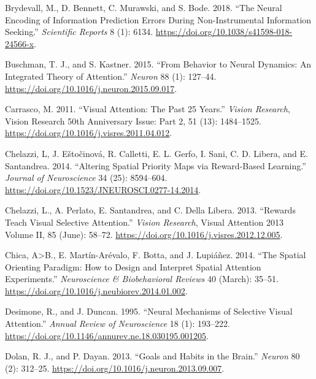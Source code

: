 \documentclass[11pt,halfline,a4paper,]{ouparticle}
\newlength{\cslhangindent}
\newlength{\cslentryspacingunit} %
\newenvironment{CSLReferences}[2] %
 {%
  \setlength{\parindent}{0pt}
  \ifodd #1
  \let\oldpar\par
  \def\par{\hangindent=\cslhangindent\oldpar}
  \fi
  \setlength{\parskip}{#2\cslentryspacingunit}
 }%
 {}
\begin{document}
\begin{CSLReferences}{1}{0}
\leavevmode{}%
Brydevall, M., D. Bennett, C. Murawski, and S. Bode. 2018. {``The Neural Encoding of Information Prediction Errors During Non-Instrumental Information Seeking.''} \emph{Scientific Reports} 8 (1): 6134. \url{https://doi.org/10.1038/s41598-018-24566-x}.

\leavevmode{}%
Buschman, T. J., and S. Kastner. 2015. {``From Behavior to Neural Dynamics: {An} Integrated Theory of Attention.''} \emph{Neuron} 88 (1): 127--44. \url{https://doi.org/10.1016/j.neuron.2015.09.017}.

\leavevmode{}%
Carrasco, M. 2011. {``Visual Attention: {The} Past 25 Years.''} \emph{Vision Research}, Vision {Research} 50th {Anniversary Issue}: {Part} 2, 51 (13): 1484--1525. \url{https://doi.org/10.1016/j.visres.2011.04.012}.

\leavevmode{}%
Chelazzi, L, J. Eštočinová, R. Calletti, E. L. Gerfo, I. Sani, C. D. Libera, and E. Santandrea. 2014. {``Altering {Spatial Priority Maps} via {Reward-Based Learning}.''} \emph{Journal of Neuroscience} 34 (25): 8594--604. \url{https://doi.org/10.1523/JNEUROSCI.0277-14.2014}.

\leavevmode{}%
Chelazzi, L., A. Perlato, E. Santandrea, and C. Della Libera. 2013. {``Rewards Teach Visual Selective Attention.''} \emph{Vision Research}, Visual {Attention} 2013 {Volume II}, 85 (June): 58--72. \url{https://doi.org/10.1016/j.visres.2012.12.005}.

\leavevmode{}%
Chica, A\textgreater B., E. Martín-Arévalo, F. Botta, and J. Lupiáñez. 2014. {``The {Spatial Orienting} Paradigm: {How} to Design and Interpret Spatial Attention Experiments.''} \emph{Neuroscience \& Biobehavioral Reviews} 40 (March): 35--51. \url{https://doi.org/10.1016/j.neubiorev.2014.01.002}.

\leavevmode{}%
Desimone, R., and J. Duncan. 1995. {``Neural {Mechanisms} of {Selective Visual Attention}.''} \emph{Annual Review of Neuroscience} 18 (1): 193--222. \url{https://doi.org/10.1146/annurev.ne.18.030195.001205}.

\leavevmode{}%
Dolan, R. J., and P. Dayan. 2013. {``Goals and {Habits} in the {Brain}.''} \emph{Neuron} 80 (2): 312--25. \url{https://doi.org/10.1016/j.neuron.2013.09.007}.


\end{CSLReferences}
\end{document}
